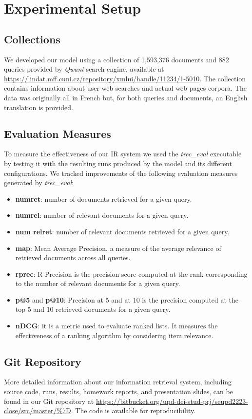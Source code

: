 \newpage
\enlargethispage{3\baselineskip}
\section{Experimental Setup}
\label{sec:setup}

\subsection{Collections}
We developed our model using a collection of 1,593,376 documents and 882 queries provided by \textit{Qwant} search engine, available at \url{https://lindat.mff.cuni.cz/repository/xmlui/handle/11234/1-5010}.
\newline
The collection contains information about user web searches and actual web pages corpora. The data was originally all in French but, for both queries and documents, an English translation is provided.


\subsection{Evaluation Measures}
To measure the effectiveness of our \ac{IR} system we used the \textit{trec\_eval} executable by testing it with the resulting runs produced by the model and its different configurations.
\newline
We tracked improvements of the following evaluation measures generated by \textit{trec\_eval}:
\begin{itemize}
	\item \textbf{num\textunderscore ret}: number of documents retrieved for a given query.
	\item \textbf{num\textunderscore rel}: number of relevant documents for a given query.
	\item \textbf{num \textunderscore rel\textunderscore ret}: number of relevant documents retrieved for a given query.
    \item \textbf{map}: Mean Average Precision, a measure of the average relevance of retrieved documents across all queries. 
    \item \textbf{rprec}: R-Precision is the precision score computed at the rank corresponding to the number of relevant documents for a given query.
    \item \textbf{p@5} and \textbf{p@10}: Precision at 5 and at 10 is the precision computed at the top 5 and 10 retrieved documents for a given query.
    \item \textbf{nDCG}: it is a metric used to evaluate ranked lists. It measures the effectiveness of a ranking algorithm by considering item relevance.
\end{itemize}


\subsection{Git Repository}
More detailed information about our information retrieval system, including source code, runs, results, homework reports, and presentation slides, can be found in our Git repository at \url{https://bitbucket.org/upd-dei-stud-prj/seupd2223-close/src/master/%7D}. 
The code is available for reproducibility.